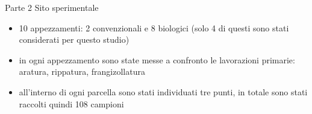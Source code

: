 \documentclass[10pt]{beamer}
\begin{document}
\begin{frame}{Parte 2 \small{Sito sperimentale}}
\begin{itemize}[<+->]
\item 10 appezzamenti: 2 convenzionali e 8 biologici (solo 4 di questi
  sono stati considerati per questo studio)
\item in ogni appezzamento sono state messe a confronto le lavorazioni
  primarie: aratura, rippatura, frangizollatura
\item all’interno di ogni parcella sono stati individuati tre punti,
  in totale sono stati raccolti quindi 108 campioni
\end{itemize}
\vfill
{}

\end{frame}
\end{document}
